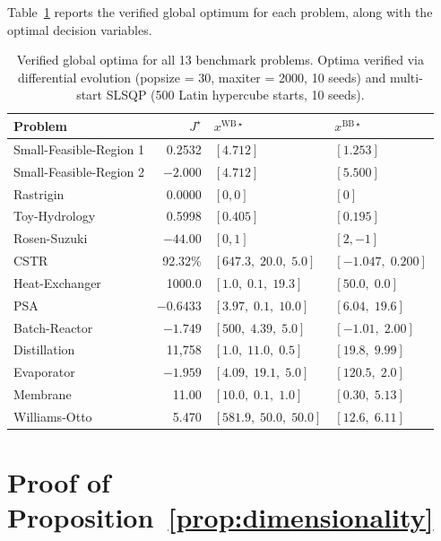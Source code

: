 \documentclass[12pt,a4paper]{article}%
\theoremstyle{plain}%
\theoremstyle{remark}%
\theoremstyle{definition}%
\def\WB{\mathrm{WB}}
\def\BB{\mathrm{BB}}
\begin{document}
\begin{appendices}
Table~\ref{tab:verified_optima} reports the verified global optimum for each problem, along with the optimal decision variables.

\begin{table}[htbp]
\centering
\caption{Verified global optima for all 13 benchmark problems. Optima verified via differential evolution (popsize = 30, maxiter = 2000, 10 seeds) and multi-start SLSQP (500 Latin hypercube starts, 10 seeds).}
\label{tab:verified_optima}
\begin{tabular}{@{}lrll@{}}
\toprule
\textbf{Problem} & $J^\star$ & $x^{\WB\star}$ & $x^{\BB\star}$ \\
\midrule
Small-Feasible-Region 1 & 0.2532 & $[4.712]$ & $[1.253]$ \\
Small-Feasible-Region 2 & $-2.000$ & $[4.712]$ & $[5.500]$ \\
Rastrigin & 0.0000 & $[0, 0]$ & $[0]$ \\
Toy-Hydrology & 0.5998 & $[0.405]$ & $[0.195]$ \\
Rosen-Suzuki & $-44.00$ & $[0, 1]$ & $[2, -1]$ \\
\midrule
CSTR & 92.32\% & $[647.3,\; 20.0,\; 5.0]$ & $[-1.047,\; 0.200]$ \\
Heat-Exchanger & 1000.0 & $[1.0,\; 0.1,\; 19.3]$ & $[50.0,\; 0.0]$ \\
PSA & $-0.6433$ & $[3.97,\; 0.1,\; 10.0]$ & $[6.04,\; 19.6]$ \\
Batch-Reactor & $-1.749$ & $[500,\; 4.39,\; 5.0]$ & $[-1.01,\; 2.00]$ \\
Distillation & 11{,}758 & $[1.0,\; 11.0,\; 0.5]$ & $[19.8,\; 9.99]$ \\
Evaporator & $-1.959$ & $[4.09,\; 19.1,\; 5.0]$ & $[120.5,\; 2.0]$ \\
Membrane & 11.00 & $[10.0,\; 0.1,\; 1.0]$ & $[0.30,\; 5.13]$ \\
Williams-Otto & 5.470 & $[581.9,\; 50.0,\; 50.0]$ & $[12.6,\; 6.11]$ \\
\bottomrule
\end{tabular}
\end{table}

\section{Proof of Proposition~\ref{prop:dimensionality}}\label{sec:proof_dimensionality}


\end{appendices}
\end{document}
